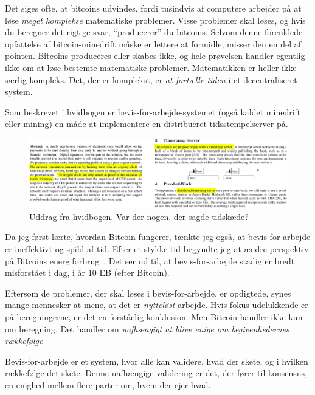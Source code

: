 \documentclass[paper=6in:9in,pagesize=pdftex,headinclude=on,footinclude=on,12pt]{scrbook}
\begin{document}
Det siges ofte, at bitcoins udvindes, fordi tusindvis af computere arbejder på at løse \textit{meget komplekse} matematiske problemer. Visse problemer skal løses, og hvis du beregner det rigtige svar, \enquote{producerer} du bitcoins. Selvom denne forenklede opfattelse af bitcoin-minedrift måske er lettere at formidle, misser den en del af pointen. Bitcoins produceres eller skabes ikke, og hele prøvelsen handler egentlig ikke om at løse bestemte matematiske problemer. Matematikken er heller ikke særlig kompleks. Det, der er komplekst, er \textit{at fortælle tiden} i et decentraliseret system.

Som beskrevet i hvidbogen er bevis-for-arbejde-systemet (også kaldet minedrift eller mining) en måde at implementere en distribueret tidsstempelserver på.\begin{figure}
  \includegraphics{assets/images/bitcoin-whitepaper-timestamp-wide.png}
  \caption{Uddrag fra hvidbogen. Var der nogen, der sagde tidskæde?}
  \label{fig:bitcoin-whitepaper-timestamp-wide}
\end{figure}

Da jeg først lærte, hvordan Bitcoin fungerer, tænkte jeg også, at bevis-for-arbejde er ineffektivt og spild af tid. Efter et stykke tid begyndte jeg at ændre perspektiv på Bitcoins energiforbrug~\cite{gigi:energy}. Det ser ud til, at bevis-for-arbejde stadig er bredt misforstået i dag, i år 10 EB (efter Bitcoin).

Eftersom de problemer, der skal løses i bevis-for-arbejde, er opdigtede, synes mange mennesker at mene, at det er \textit{nytteløst} arbejde. Hvis fokus udelukkende er på beregningerne, er det en forståelig konklusion. Men Bitcoin handler ikke kun om beregning. Det handler om \textit{uafhængigt at blive enige om begivenhedernes rækkefølge}

Bevis-for-arbejde er et system, hvor alle kan validere, hvad der skete, og i hvilken rækkefølge det skete. Denne uafhængige validering er det, der fører til konsensus, en enighed mellem flere parter om, hvem der ejer hvad.
\end{document}
